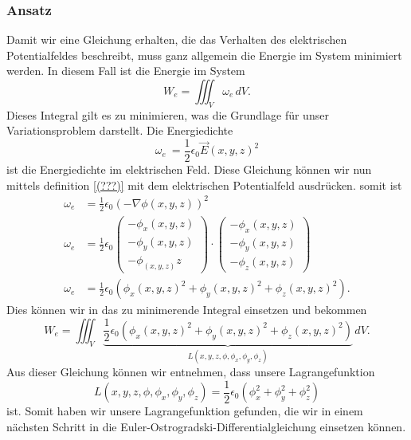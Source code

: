 \subsubsection{Ansatz}
Damit wir eine Gleichung erhalten, die das Verhalten des elektrischen Potentialfeldes beschreibt, muss ganz allgemein die Energie im System minimiert werden. 
In diesem Fall ist die Energie im System
\[
W_e
=
\iiint_V \omega_e\, dV.
\]
Dieses Integral gilt es zu minimieren, was die Grundlage für unser Variationsproblem darstellt.
Die Energiedichte
\[
\omega_e\
=
\frac{1}{2}\epsilon_0\vec{E}(x,y,z)^2
\]
ist die Energiedichte im elektrischen Feld.
Diese Gleichung können wir nun mittels definition \ref{(???)} mit dem elektrischen Potentialfeld ausdrücken.
somit ist
\begin{align}
\omega_e
&=
\frac{1}{2}\epsilon_0\left(-\nabla\phi(x,y,z)\right)^2
\\
\omega_e
&=
\frac{1}{2}\epsilon_0
\begin{pmatrix}
-\phi_x(x,y,z)\\
-\phi_y(x,y,z)\\
-\phi_(x,y,z)z
\end{pmatrix}
\cdot
\begin{pmatrix}
-\phi_x(x,y,z)\\
-\phi_y(x,y,z)\\
-\phi_z(x,y,z)
\end{pmatrix}
\\
\omega_e
&=
\frac{1}{2}\epsilon_0\left(\phi_x(x,y,z)^2 + \phi_y(x,y,z)^2 + \phi_z(x,y,z)^2\right).
\label{maxwell:section:energiedichte}
\end{align}
Dies können wir in das zu minimerende Integral einsetzen und bekommen
\begin{equation}
	W_e
	=
	\iiint_V \underbrace{
		\frac{1}{2}\epsilon_0\left(\phi_x(x,y,z)^2 + \phi_y(x,y,z)^2 + \phi_z(x,y,z)^2\right)}_{L(x,y,z,\phi,\phi_x,\phi_y,\phi_z)}\, dV.
	\label{maxwell:section:energieintegral_quellenfrei}
\end{equation}
Aus dieser Gleichung können wir entnehmen, dass unsere Lagrangefunktion
\begin{equation}
	L(x,y,z,\phi,\phi_x,\phi_y,\phi_z)
	=
	\frac{1}{2}\epsilon_0\left(\phi_x^2 + \phi_y^2 + \phi_z^2\right)
	\label{maxwell:section:lagrangefunktion_quellenfrei}
\end{equation}
ist.
Somit haben wir unsere Lagrangefunktion gefunden, die wir in einem nächsten Schritt in die Euler-Ostrogradski-Differentialgleichung einsetzen können.

